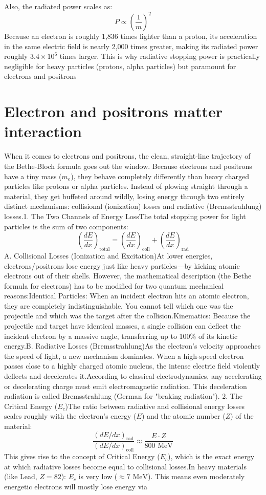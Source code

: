 \documentclass{article}
\begin{document}
Also, the radiated power scales as:  $$P \propto \left(\frac{1}{m}\right)^2$$ 
Because an electron is roughly 1,836 times lighter than a proton, its acceleration in the same electric field is nearly 2,000 times greater, making its radiated power roughly $3.4 \times 10^6$ times larger. This is why radiative stopping power is practically negligible for heavy particles (protons, alpha particles) but paramount for electrons and positrons






\section{Electron and positrons matter interaction}

When it comes to electrons and positrons, the clean, straight-line trajectory of the Bethe-Bloch formula goes out the window. Because electrons and positrons have a tiny mass ($m_e$), they behave completely differently than heavy charged particles like protons or alpha particles. Instead of plowing straight through a material, they get buffeted around wildly, losing energy through two entirely distinct mechanisms: collisional (ionization) losses and radiative (Bremsstrahlung) losses.1. The Two Channels of Energy LossThe total stopping power for light particles is the sum of two components:$$\left(\frac{dE}{dx}\right)_{\text{total}} = \left(\frac{dE}{dx}\right)_{\text{coll}} + \left(\frac{dE}{dx}\right)_{\text{rad}}$$A. Collisional Losses (Ionization and Excitation)At lower energies, electrons/positrons lose energy just like heavy particles—by kicking atomic electrons out of their shells. However, the mathematical description (the Bethe formula for electrons) has to be modified for two quantum mechanical reasons:Identical Particles: When an incident electron hits an atomic electron, they are completely indistinguishable. You cannot tell which one was the projectile and which was the target after the collision.Kinematics: Because the projectile and target have identical masses, a single collision can deflect the incident electron by a massive angle, transferring up to 100\% of its kinetic energy.B. Radiative Losses (Bremsstrahlung)As the electron’s velocity approaches the speed of light, a new mechanism dominates. When a high-speed electron passes close to a highly charged atomic nucleus, the intense electric field violently deflects and decelerates it.According to classical electrodynamics, any accelerating or decelerating charge must emit electromagnetic radiation. This deceleration radiation is called Bremsstrahlung (German for "braking radiation").  2. The Critical Energy ($E_c$)The ratio between radiative and collisional energy losses scales roughly with the electron's energy ($E$) and the atomic number ($Z$) of the material:$$\frac{(dE/dx)_{\text{rad}}}{(dE/dx)_{\text{coll}}} \approx \frac{E \cdot Z}{800 \text{ MeV}}$$This gives rise to the concept of Critical Energy ($E_c$), which is the exact energy at which radiative losses become equal to collisional losses.In heavy materials (like Lead, $Z=82$): $E_c$ is very low ($\approx 7 \text{ MeV}$). This means even moderately energetic electrons will mostly lose energy via 
\end{document}
